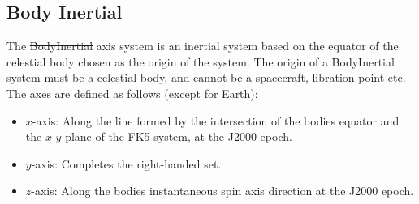 {%
\subsection{Body Inertial}  \label{Sec:BodyInertial} 


The \st{BodyInertial} axis system is an inertial system based on the
equator of the celestial body chosen as the origin of the system.
The origin of a \st{BodyInertial} system must be a celestial body,
and cannot be a spacecraft, libration point etc. The axes are
defined as follows (except for Earth):
%
\begin{itemize}
\item $x$-axis:  Along the line formed by the intersection of the
bodies equator and the $x$-$y$ plane of the FK5 system, at the J2000
epoch.
%
\item $y$-axis:  Completes the right-handed set.
%
\item $z$-axis:  Along the bodies instantaneous spin axis direction at the
J2000 epoch.
\end{itemize}
%

}
